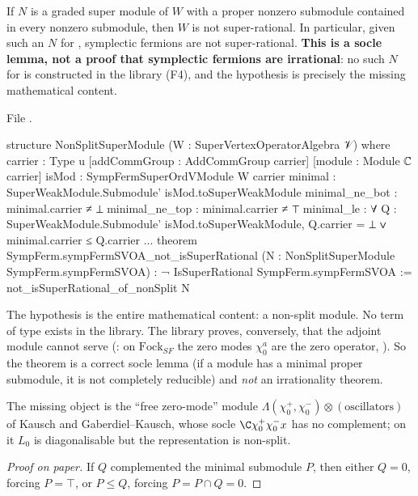 \begin{theorem}\label{l17:thm:sfirrat}
If $N$ is a graded super module of $W$ with a proper nonzero submodule contained in every nonzero
submodule, then $W$ is not super-rational. In particular, given such an $N$ for
, symplectic fermions are not super-rational. \textbf{This is a socle lemma, not
a proof that symplectic fermions are irrational}: no such $N$ for  is constructed
in the library (F4), and the hypothesis is precisely the missing mathematical content.
\end{theorem}
\noindent File .
\begin{leancode}
structure NonSplitSuperModule (W : SuperVertexOperatorAlgebra 𝒱) where
  carrier : Type u
  [addCommGroup : AddCommGroup carrier]
  [module : Module ℂ carrier]
  isMod : SympFermSuperOrdVModule W carrier
  minimal : SuperWeakModule.Submodule' isMod.toSuperWeakModule
  minimal_ne_bot : minimal.carrier ≠ ⊥
  minimal_ne_top : minimal.carrier ≠ ⊤
  minimal_le : ∀ Q : SuperWeakModule.Submodule' isMod.toSuperWeakModule,
    Q.carrier = ⊥ ∨ minimal.carrier ≤ Q.carrier
...
theorem SympFerm.sympFermSVOA_not_isSuperRational
    (N : NonSplitSuperModule SympFerm.sympFermSVOA) : ¬ IsSuperRational SympFerm.sympFermSVOA :=
  not_isSuperRational_of_nonSplit N
\end{leancode}
\begin{dictionary}
The hypothesis  is the entire mathematical content: a non-split module. No term of type
 exists in the library. The library proves, conversely, that the
adjoint module cannot serve (: on $\mathrm{Fock}_{SF}$ the zero
modes $\chi^a_0$ are the zero operator, ). So the theorem is a correct
socle lemma (if a module has a minimal proper submodule, it is not completely reducible) and
\emph{not} an irrationality theorem.
\end{dictionary}
\begin{physics}
The missing object is the ``free zero-mode'' module $\Lambda(\chi^+_0,\chi^-_0)\otimes(\text{oscillators})$
of Kausch and Gaberdiel--Kausch, whose socle $\C\chi^+_0\chi^-_0x$ has no complement; on it $L_0$
is diagonalisable but the representation is non-split.
\end{physics}
\begin{proof}[Proof on paper]
If $Q$ complemented the minimal submodule $P$, then either $Q=0$, forcing $P=\top$, or $P\le Q$,
forcing $P=P\cap Q=0$.
\end{proof}
